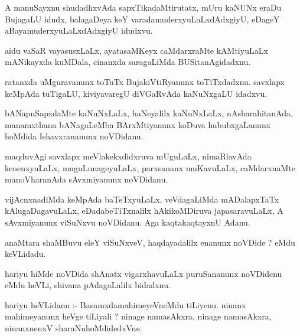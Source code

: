 \documentclass{article}
\begin{document}
\begin{mn}
A  manuSayxnu  shudadhxvAda  sapxTikadaMtirutatx,  mUru  kaNUNx  eraDu  BujagaLU  idudx,  balagaDeya  keY  
varadamuderxyuLaLxdAdxgiyU,  eDageY  aBayamuderxyuLaLxdAdxgiyU  idudxvu.
\end{mn}

\begin{mn}
aidu  vaSaR  vayasusxLaLx,  ayatasaMKeyx  caMdarxraMte  kAMtiyuLaLx  mANikayxda  kuMDala,  cinanxda  
saragaLiMda  BUSitanAgidadxnu.
\end{mn}

\begin{mn}
ratanxda  uMguravanunx  toTuTx  BujakiVtiRyanunx  toTiTxdadxnu.  savxlapx  keMpAda tuTigaLU,  kiviyavaregU  
diVGaRvAda  kaNuNxgaLU  idadxvu.
\end{mn}

\begin{mn}
bANapuSapxdaMte  kaNuNxLaLx,  haNeyalilx  kaNuNxLaLx,  nAsharahitanAda,  manamxthana  bANagaLeMba  
BArxMtiyanunx  koDuva  hububxgaLanunx  hoMdida  Ishavxrananunx  noVDidanu.
\end{mn}

\begin{mn}
maqduvAgi  savxlapx  meVlakekxdidxruva  mUguLaLx,  nimaRlavAda  kenenxyuLaLx,  muguLunageyuLaLx,  
parxsananx muKavuLaLx,  caMdarxnaMte  manoVharanAda  sAvxmiyanunx  noVDidanu.
\end{mn}

\begin{mn}
vijAcnxnadiMda  keMpAda  baTeTxyuLaLx,  veVdagaLiMda  mADalapxTaTx  kAlugaDagavuLaLx,  eDadabeTiTxnalilx  
hAkikoMDiruva  japasaravuLaLx,  A  sAvxmiyanunx  viSuNxvu  noVDidanu.  Aga kaqtakaqtayxnU  Adanu.
\end{mn}

\begin{mn}
anaMtara  shaMBuvu  eleY  viSuNxveV,  haqdayadalilx  enanunx  noVDide ?  eMdu  keVLidadu.
\end{mn}

\begin{mn}
hariyu  hiMde  noVDida  shAnatx vigarxhavuLaLx  puruSananunx  noVDidenu  eMdu  heVLi,  shivana  pAdagaLalilx  bidadxnu.
\end{mn}

\begin{mn}
hariyu  heVLidanu :- BasamxdamahimeyeVneMdu  tiLiyenu.  ninanx  mahimeyanunx  heVge  tiLiyali ?  
ninage  namasAkxra,  ninage  namasAkxra,  ninanxnenxV  sharaNuhoMdidedxVne.
\end{mn}
\end{document}
